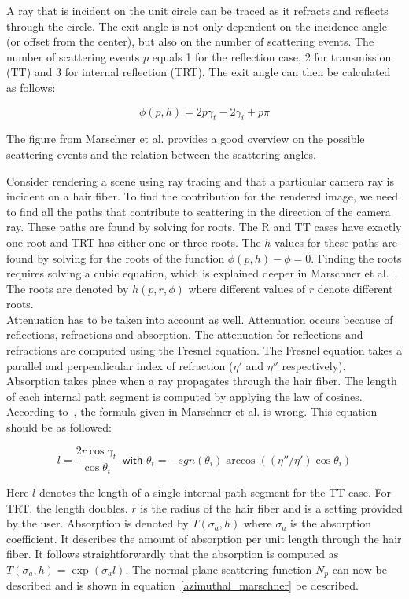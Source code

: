 \documentclass[11pt,a4paper]{report}
\begin{document}
A ray that is incident on the unit circle can be traced as it refracts and reflects through the circle. The exit angle is not only dependent on the incidence angle (or offset from the center), but also on the number of scattering events. The number of scattering events $p$ equals 1 for the reflection case, 2 for transmission (TT) and 3 for internal reflection (TRT). The exit angle can then be calculated as follows:

\begin{equation}
\phi(p,h) = 2p \gamma_t - 2 \gamma_i + p \pi
\end{equation}

The figure from Marschner et al. provides a good overview on the possible scattering events and the relation between the scattering angles.

Consider rendering a scene using ray tracing and that a particular camera ray is incident on a hair fiber. To find the contribution for the rendered image, we need to find all the paths that contribute to scattering in the direction of the camera ray. These paths are found by solving for roots. The R and TT cases have exactly one root and TRT has either one or three roots. The $h$ values for these paths are found by solving for the roots of the function $\phi(p, h) - \phi = 0$. Finding the roots requires solving a cubic equation, which is explained deeper in Marschner et al.~\cite{marschner}. The roots are denoted by $h(p, r, \phi)$ where different values of $r$ denote different roots. \\


Attenuation has to be taken into account as well. Attenuation occurs because of reflections, refractions and absorption. The attenuation for reflections and refractions are computed using the Fresnel equation. The Fresnel equation takes a parallel and perpendicular index of refraction ($\eta'$ and $\eta''$ respectively). Absorption takes place when a ray propagates through the hair fiber. The length of each internal path segment is computed by applying the law of cosines. According to~\cite{}, the formula given in Marschner et al. is wrong. This equation should be as followed:

\begin{equation}
l = \frac{2r \cos \gamma_t}{\cos \theta_t}\,\,\, \textsf{with $\theta_t = -sgn(\theta_i) \arccos ((\eta'' / \eta') \cos \theta_i)$}
\end{equation}

Here $l$ denotes the length of a single internal path segment for the TT case. For TRT, the length doubles. $r$ is the radius of the hair fiber and is a setting provided by the user. Absorption is denoted by $T(\sigma_a, h)$ where $\sigma_a$ is the absorption coefficient. It describes the amount of absorption per unit length through the hair fiber. It follows straightforwardly that the absorption is computed as $T(\sigma_a, h) = \exp( \sigma_a l )$. The normal plane scattering function $N_p$ can now be described and is shown in equation~\ref{azimuthal_marschner} be described.
\end{document}
